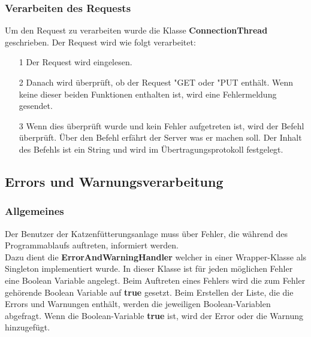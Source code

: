 \subsubsection{Verarbeiten des Requests}
Um den Request zu verarbeiten wurde die Klasse \textbf{ConnectionThread} geschrieben. Der Request wird wie folgt verarbeitet:
\begin{itemize}
\item[1] Der Request wird eingelesen.
\item[2] Danach wird überprüft, ob der Request "GET\grqq{} oder "PUT\grqq{} enthält. Wenn keine dieser beiden Funktionen enthalten ist, wird eine Fehlermeldung gesendet.
\item[3] Wenn dies überprüft wurde und kein Fehler aufgetreten ist, wird der Befehl überprüft. Über den Befehl erfährt der Server was er machen soll. Der Inhalt des Befehls ist ein String und wird im Übertragungsprotokoll festgelegt.
\end{itemize}

\subsection{Errors und Warnungsverarbeitung}
\subsubsection{Allgemeines}
Der Benutzer der Katzenfütterungsanlage muss über Fehler, die während des Programmablaufs auftreten, informiert werden. 
\\ Dazu dient die \textbf{ErrorAndWarningHandler} welcher in einer Wrapper-Klasse als Singleton implementiert wurde. In dieser Klasse ist für jeden möglichen Fehler eine Boolean Variable angelegt. Beim Auftreten eines Fehlers wird die zum Fehler gehörende Boolean Variable auf \textbf{true} gesetzt. Beim Erstellen der Liste, die die Errors und Warnungen enthält, werden die jeweiligen Boolean-Variablen abgefragt. Wenn die Boolean-Variable \textbf{true} ist, wird der Error oder die Warnung hinzugefügt. 

\newpage

